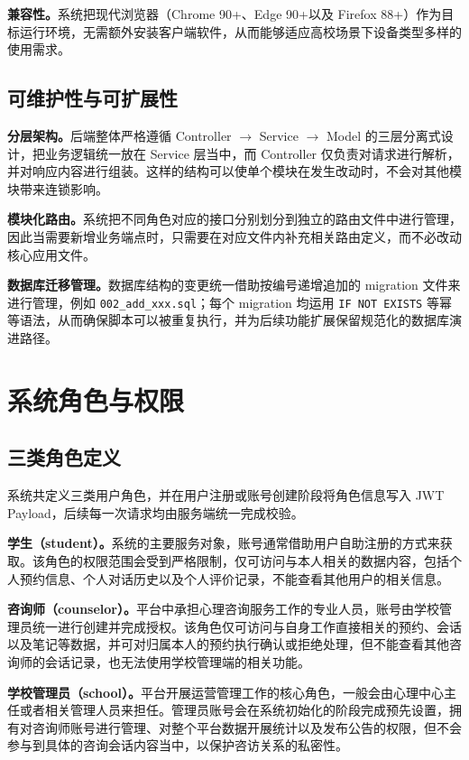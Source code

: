 \textbf{兼容性。}系统把现代浏览器（Chrome 90+、Edge 90+以及 Firefox 88+）作为目标运行环境，无需额外安装客户端软件，从而能够适应高校场景下设备类型多样的使用需求。

\subsection{可维护性与可扩展性}

\textbf{分层架构。}后端整体严格遵循 Controller $\rightarrow$ Service $\rightarrow$ Model 的三层分离式设计，把业务逻辑统一放在 Service 层当中，而 Controller 仅负责对请求进行解析，并对响应内容进行组装。这样的结构可以使单个模块在发生改动时，不会对其他模块带来连锁影响。

\textbf{模块化路由。}系统把不同角色对应的接口分别划分到独立的路由文件中进行管理，因此当需要新增业务端点时，只需要在对应文件内补充相关路由定义，而不必改动核心应用文件。

\textbf{数据库迁移管理。}数据库结构的变更统一借助按编号递增追加的 migration 文件来进行管理，例如 \texttt{002\_add\_xxx.sql}；每个 migration 均运用 \texttt{IF NOT EXISTS} 等幂等语法，从而确保脚本可以被重复执行，并为后续功能扩展保留规范化的数据库演进路径。


\section{系统角色与权限}

\subsection{三类角色定义}

系统共定义三类用户角色，并在用户注册或账号创建阶段将角色信息写入 JWT Payload，后续每一次请求均由服务端统一完成校验。

\textbf{学生（student）。}系统的主要服务对象，账号通常借助用户自助注册的方式来获取。该角色的权限范围会受到严格限制，仅可访问与本人相关的数据内容，包括个人预约信息、个人对话历史以及个人评价记录，不能查看其他用户的相关信息。

\textbf{咨询师（counselor）。}平台中承担心理咨询服务工作的专业人员，账号由学校管理员统一进行创建并完成授权。该角色仅可访问与自身工作直接相关的预约、会话以及笔记等数据，并可对归属本人的预约执行确认或拒绝处理，但不能查看其他咨询师的会话记录，也无法使用学校管理端的相关功能。

\textbf{学校管理员（school）。}平台开展运营管理工作的核心角色，一般会由心理中心主任或者相关管理人员来担任。管理员账号会在系统初始化的阶段完成预先设置，拥有对咨询师账号进行管理、对整个平台数据开展统计以及发布公告的权限，但不会参与到具体的咨询会话内容当中，以保护咨访关系的私密性。

